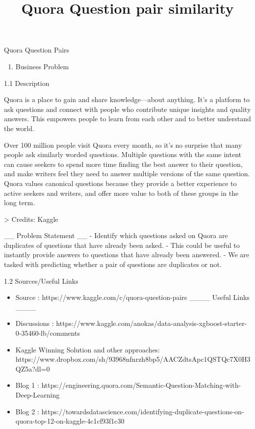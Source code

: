 \documentclass[11pt]{article}
\title{Quora Question pair similarity}
\providecommand{\tightlist}{%
      \setlength{\itemsep}{0pt}\setlength{\parskip}{0pt}}
\begin{document}
    
    
    \maketitle
    
    

    
    Quora Question Pairs

    \begin{enumerate}
\def\labelenumi{\arabic{enumi}.}
\tightlist
\item
  Business Problem
\end{enumerate}

    1.1 Description

    Quora is a place to gain and share knowledge---about anything. It's a
platform to ask questions and connect with people who contribute unique
insights and quality answers. This empowers people to learn from each
other and to better understand the world.

Over 100 million people visit Quora every month, so it's no surprise
that many people ask similarly worded questions. Multiple questions with
the same intent can cause seekers to spend more time finding the best
answer to their question, and make writers feel they need to answer
multiple versions of the same question. Quora values canonical questions
because they provide a better experience to active seekers and writers,
and offer more value to both of these groups in the long term.

 \textgreater{} Credits: Kaggle

    \_\_ Problem Statement \_\_ - Identify which questions asked on Quora
are duplicates of questions that have already been asked. - This could
be useful to instantly provide answers to questions that have already
been answered. - We are tasked with predicting whether a pair of
questions are duplicates or not.

    1.2 Sources/Useful Links

    \begin{itemize}
\tightlist
\item
  Source : https://www.kaggle.com/c/quora-question-pairs \_\_\_\_ Useful
  Links \_\_\_\_
\item
  Discussions :
  https://www.kaggle.com/anokas/data-analysis-xgboost-starter-0-35460-lb/comments
\item
  Kaggle Winning Solution and other approaches:
  https://www.dropbox.com/sh/93968nfnrzh8bp5/AACZdtsApc1QSTQc7X0H3QZ5a?dl=0
\item
  Blog 1 :
  https://engineering.quora.com/Semantic-Question-Matching-with-Deep-Learning
\item
  Blog 2 :
  https://towardsdatascience.com/identifying-duplicate-questions-on-quora-top-12-on-kaggle-4c1cf93f1c30
\end{itemize}
\end{document}

